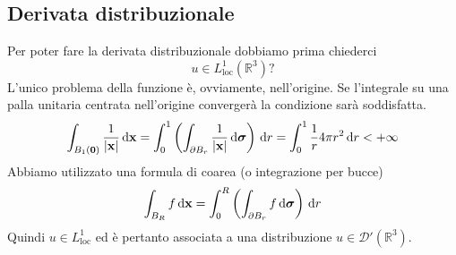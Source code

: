 \subsection{Derivata distribuzionale}

Per poter fare la derivata distribuzionale dobbiamo prima chiederci
\begin{equation*}
    u\in L^{1}_{\text{loc}}\left(\mathbb{R}^{3}\right) ?
\end{equation*}
L'unico problema della funzione è, ovviamente, nell'origine. Se l'integrale su una palla unitaria centrata nell'origine convergerà la condizione sarà soddisfatta.
\begin{equation*}
    \int _{B_{1}(\mathbf{0})}\frac{1}{| \mathbf{x}| } \,\mathrm d \mathbf{x} =\int ^{1}_{0}\left(\int _{\partial B_{r}}\frac{1}{| \mathbf{x}| } \,\mathrm d \bm{\sigma} \right) \,\mathrm d r=\int ^{1}_{0}\frac{1}{r} 4\pi r^{2} \,\mathrm d r< +\infty
\end{equation*}
Abbiamo utilizzato una formula di coarea (o integrazione per bucce)
\begin{equation*}
    \int _{B_{R}} f\,\mathrm d \mathbf{x} =\int ^{R}_{0}\left(\int _{\partial B_{r}} f\,\mathrm d \bm{\sigma} \right) \,\mathrm d r
\end{equation*}
Quindi $\displaystyle u\in L_{\text{loc}}^{1}$ ed è pertanto associata a una distribuzione $\displaystyle u\in \mathcal{D} '\left(\mathbb{R}^{3}\right)$.

